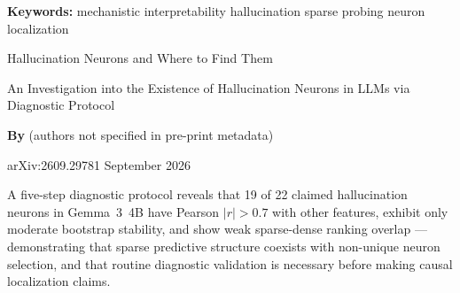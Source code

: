 \documentclass[10pt,twocolumn]{article}
\begin{document}
\setlength{\parindent}{0pt}
\setlength{\parskip}{4pt}

{\small\color{keywordgray}\textbf{Keywords:}
  mechanistic interpretability \textbullet{}
  hallucination \textbullet{}
  sparse probing \textbullet{}
  neuron localization}\par\vspace{4pt}

{\LARGE\bfseries\raggedright
  Hallucination Neurons and Where to Find Them}\par\vspace{4pt}

{\large\itshape\raggedright
  An Investigation into the Existence of Hallucination Neurons in LLMs
  via Diagnostic Protocol}\par\vspace{6pt}

{\small\textbf{By} (authors not specified in pre-print metadata)}\par\vspace{2pt}

{\small\color{keywordgray}arXiv:2609.29781 \textbullet{} September 2026}
\par\vspace{2pt}\noindent{\color{rulered}\rule{\columnwidth}{0.6pt}}\vspace{6pt}

A five-step diagnostic protocol reveals that 19 of 22 claimed hallucination
neurons in Gemma~3~4B have Pearson $|r|>0.7$ with other features, exhibit
only moderate bootstrap stability, and show weak sparse-dense ranking overlap
--- demonstrating that sparse predictive structure coexists with non-unique
neuron selection, and that routine diagnostic validation is necessary before
making causal localization claims.
\end{document}
